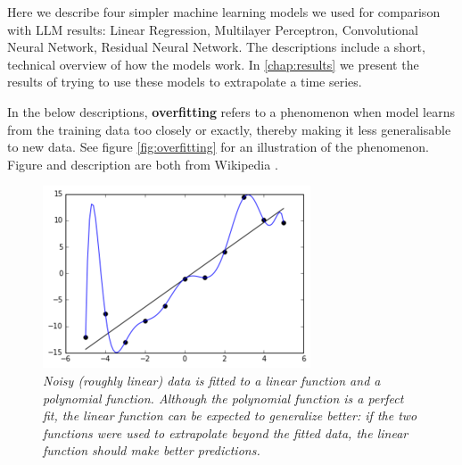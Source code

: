 Here we describe four simpler machine learning models we used for comparison with LLM results: Linear Regression, Multilayer Perceptron, Convolutional Neural Network, Residual Neural Network. The descriptions include a short, technical overview of how the models work. In \autoref{chap:results} we present the results of trying to use these models to extrapolate a time series.

In the below descriptions, \textbf{overfitting} refers to a phenomenon when model learns from the training data too closely or exactly, thereby making it less generalisable to new data. See  figure  \autoref{fig:overfitting} for an illustration of the phenomenon. Figure and description are both from Wikipedia \cite{overfitting}.
\begin{figure}[h!]
	\centering
	\includegraphics[width=0.5\linewidth]{"pictures/overfitted_data.png"}
	\caption{\textit{Noisy (roughly linear) data is fitted to a linear function and a polynomial function. Although the polynomial function is a perfect fit, the linear function can be expected to generalize better: if the two functions were used to extrapolate beyond the fitted data, the linear function should make better predictions.}}
	\label{fig:overfitting}
\end{figure}
